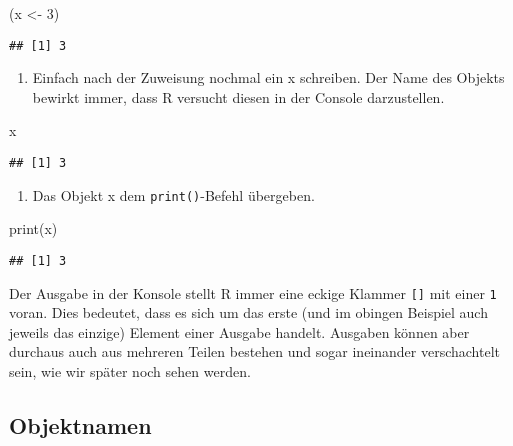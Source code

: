 \documentclass[
]{book}
\newenvironment{Shaded}{\begin{snugshade}}{\end{snugshade}}
\newcommand{\DecValTok}[1]{\textcolor[rgb]{0.00,0.00,0.81}{#1}}
\newcommand{\FunctionTok}[1]{\textcolor[rgb]{0.00,0.00,0.00}{#1}}
\newcommand{\NormalTok}[1]{#1}
\newcommand{\OtherTok}[1]{\textcolor[rgb]{0.56,0.35,0.01}{#1}}
\providecommand{\tightlist}{%
  \setlength{\itemsep}{0pt}\setlength{\parskip}{0pt}}
\begin{document}
\begin{Shaded}
\begin{Highlighting}[]
\NormalTok{(x }\OtherTok{\textless{}{-}} \DecValTok{3}\NormalTok{)}
\end{Highlighting}
\end{Shaded}

\begin{verbatim}
## [1] 3
\end{verbatim}

\begin{enumerate}
\def\labelenumi{\arabic{enumi}.}
\setcounter{enumi}{1}
\tightlist
\item
  Einfach nach der Zuweisung nochmal ein x schreiben. Der Name des Objekts bewirkt immer, dass R versucht diesen in der Console darzustellen.
\end{enumerate}

\begin{Shaded}
\begin{Highlighting}[]
\NormalTok{x}
\end{Highlighting}
\end{Shaded}

\begin{verbatim}
## [1] 3
\end{verbatim}

\begin{enumerate}
\def\labelenumi{\arabic{enumi}.}
\setcounter{enumi}{2}
\tightlist
\item
  Das Objekt x dem \texttt{print()}-Befehl übergeben.
\end{enumerate}

\begin{Shaded}
\begin{Highlighting}[]
\FunctionTok{print}\NormalTok{(x)}
\end{Highlighting}
\end{Shaded}

\begin{verbatim}
## [1] 3
\end{verbatim}

Der Ausgabe in der Konsole stellt R immer eine eckige Klammer \texttt{{[}{]}} mit einer \texttt{1} voran. Dies bedeutet, dass es sich um das erste (und im obingen Beispiel auch jeweils das einzige) Element einer Ausgabe handelt. Ausgaben können aber durchaus auch aus mehreren Teilen bestehen und sogar ineinander verschachtelt sein, wie wir später noch sehen werden.

\hypertarget{objektnamen}{%
\subsection{Objektnamen}\label{objektnamen}}
\end{document}
